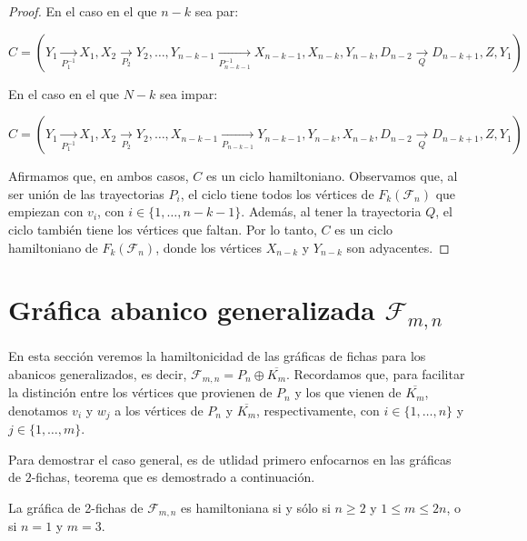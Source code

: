 \begin{proof}
    En el caso en el que $n-k$ sea par:
            
    $C =(Y_1 \xrightarrow[P_1^{-1}]{} X_1, X_2 \xrightarrow[P_2]{} Y_2, \dots,
    Y_{n-k-1} \xrightarrow[P_{n-k-1}^{-1}]{} X_{n-k-1}, X_{n-k}, Y_{n-k},
    D_{n-2} \xrightarrow[Q]{} D_{n-k+1}, Z, Y_1)$
    
    En el caso en el que $N-k$ sea impar:
    
    $C = (Y_1 \xrightarrow[P_1^{-1}]{} X_1, X_2 \xrightarrow[P_2]{} Y_2, \dots,
    X_{n-k-1} \xrightarrow[P_{n-k-1}]{} Y_{n-k-1}, Y_{n-k}, X_{n-k}, D_{n-2}
    \xrightarrow[Q]{} D_{n-k+1}, Z, Y_1)$
    
    Afirmamos que, en ambos casos, $C$ es un ciclo hamiltoniano. Observamos que,
    al ser uni\'on de las trayectorias $P_i$, el ciclo tiene todos los
    v\'ertices de $F_k(\mathcal{F}_n)$ que empiezan con $v_i$, con $i \in \{1,
    \dots, n-k-1\}$. Adem\'as, al tener la trayectoria $Q$, el ciclo tambi\'en
    tiene los v\'ertices que faltan. Por lo tanto, $C$ es un ciclo hamiltoniano
    de $F_k(\mathcal{F}_n)$, donde los v\'ertices $X_{n-k}$ y $Y_{n-k}$ son
    adyacentes. 

\end{proof}

\section{Gr\'afica abanico generalizada
\texorpdfstring{$\mathcal{F}_{m,n}$}{Fmn}}%
\label{sec:GeneralFan}

En esta secci\'on veremos la hamiltonicidad de las gr\'aficas de fichas para los
abanicos generalizados, es decir, $\mathcal{F}_{m,n}=P_n \oplus \overline{K_m}$.
Recordamos que, para facilitar la distinci\'on entre los v\'ertices que
provienen de $P_n$ y los que vienen de $\overline{K_m}$, denotamos $v_i$ y $w_j$
a los v\'ertices de $P_n$ y $\overline{K_m}$, respectivamente, con $i \in \{1,
\dots, n\}$ y $j \in \{1, \dots, m\}$. 

Para demostrar el caso general, es de utlidad primero enfocarnos en las
gr\'aficas de $2$-fichas, teorema que es demostrado a continuaci\'on.

\begin{teorema}
\label{teo:2-TokGenerFan}
    La gr\'afica de 2-fichas de $\mathcal{F}_{m,n}$ es hamiltoniana si y s\'olo
    si $n \geq 2$ y $1 \leq m \leq 2n$, o si $n=1$ y $m=3$.
\end{teorema}

